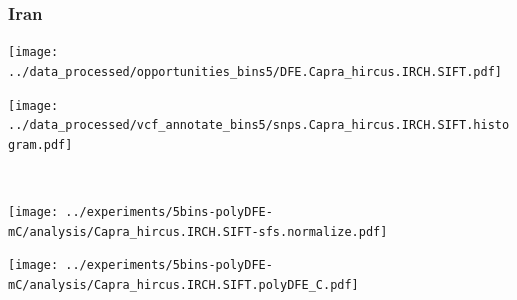 \subsubsection{Iran}

\begin{minipage}{0.49\linewidth}
    \texttt{[image: ../data\_processed/opportunities\_bins5/DFE.Capra\_hircus.IRCH.SIFT.pdf]}
\end{minipage}
\begin{minipage}{0.49\linewidth}
    \texttt{[image: ../data\_processed/vcf\_annotate\_bins5/snps.Capra\_hircus.IRCH.SIFT.histogram.pdf]}
\end{minipage}
\\
\begin{minipage}{0.49\linewidth}
    \texttt{[image: ../experiments/5bins-polyDFE-mC/analysis/Capra\_hircus.IRCH.SIFT-sfs.normalize.pdf]}
\end{minipage}
\begin{minipage}{0.4\linewidth}
    \texttt{[image: ../experiments/5bins-polyDFE-mC/analysis/Capra\_hircus.IRCH.SIFT.polyDFE\_C.pdf]}
\end{minipage}
